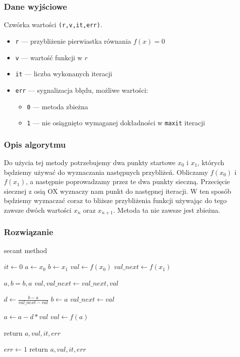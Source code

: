 \documentclass{article}
\begin{document}
\subsubsection*{Dane wyjściowe}
	Czwórka wartości \texttt{(r,v,it,err)}.
	\begin{itemize}
	    \item \texttt{r} — przybliżenie pierwiastka równania $f(x) = 0$
	    \item \texttt{v} — wartość funkcji w $r$
	    \item \texttt{it} — liczba wykonanych iteracji
	    \item \texttt{err} — sygnalizacja błędu, możliwe wartości:
	    \begin{itemize}
	        \item \texttt{0} — metoda zbieżna
	        \item \texttt{1} — nie osiągnięto wymaganej dokładności w \texttt{maxit} iteracji
	    \end{itemize}
	\end{itemize}
\subsubsection*{Opis algorytmu}
	Do użycia tej metody potrzebujemy dwa punkty startowe $x_0$ i $x_1$, których będziemy używać do wyznaczania następnych przybliżeń. Obliczamy $f(x_0)$ i $f(x_1)$, a następnie poprowadzamy przez te dwa punkty sieczną. Przecięcie siecznej z osią OX wyznaczy nam punkt do następnej iteracji. W ten sposób będziemy wyznaczać coraz to bliższe przybliżenia funkcji używając do tego zawsze dwóch wartości $x_n$ oraz $x_{n+1}$.
	Metoda ta nie zawsze jest zbieżna.
\subsubsection*{Rozwiązanie}
	\begin{algorithm}[H]
	\caption{secant method}
	\begin{algorithmic}
		\State $it \gets 0$
		\State $a \gets x_0$
		\State $b \gets x_1$
		\State $val \gets f(x_0)$
		\State $val\_next \gets f(x_1)$

				\State $a, b = b, a$
				\State $val, val\_next \gets val\_next, val$
			\EndIf

			\State $d \gets \frac{b - a}{val\_next - val}$
			\State $b \gets a$
			\State $val\_next \gets val$

			\State $a \gets a - d * val$
			\State $val \gets f(a)$

				\State return $a, val, it ,err$
			\EndIf
		\EndFor

		\State $err \gets 1$
		\State return $a, val, it, err$
    \end{algorithmic}
    \end{algorithm}
\end{document}
